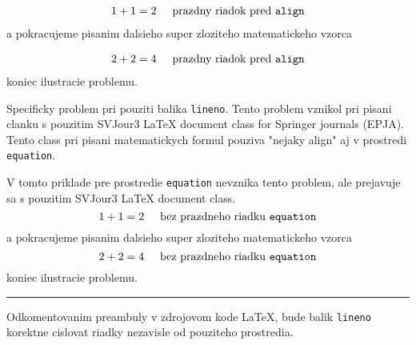 \documentclass[twocolumn]{article}
\begin{document}
\begin{align}
  1+1=2 \hspace{0.5cm}\text{prazdny riadok pred }\texttt{align}
\end{align}
a pokracujeme pisanim dalsieho super zloziteho matematickeho vzorca

\begin{align}
  2+2=4 \hspace{0.5cm}\text{prazdny riadok pred }\texttt{align}
\end{align}
koniec ilustracie problemu.

\newpage
Specificky problem pri pouziti balika \texttt{lineno}. Tento problem vznikol pri
pisani clanku s pouzitim SVJour3 LaTeX document class for Springer journals
(EPJA). Tento class pri pisani matematickych formul pouziva "nejaky align" aj v
prostredi \texttt{equation}.

V tomto priklade pre prostredie \texttt{equation} nevznika tento problem,
ale prejavuje sa s pouzitim SVJour3 LaTeX document class.
\begin{equation}
  1+1=2 \hspace{0.5cm}\text{bez prazdneho riadku }\texttt{equation}
\end{equation}
a pokracujeme pisanim dalsieho super zloziteho matematickeho vzorca
\begin{equation}
  2+2=4 \hspace{0.5cm}\text{bez prazdneho riadku }\texttt{equation}
\end{equation}
koniec ilustracie problemu.

\vspace{0.5cm}
\hrule
\vspace{0.5cm}
Odkomentovanim preambuly v zdrojovom kode \LaTeX, bude balik \texttt{lineno}
korektne cislovat riadky nezavisle od pouziteho prostredia.
\end{document}
